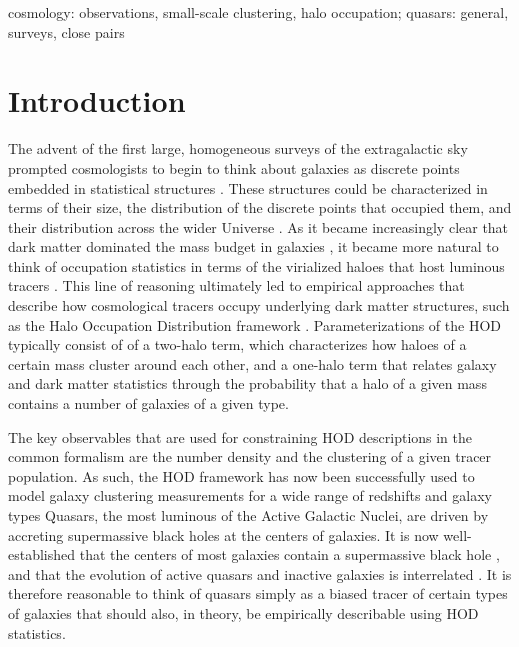 \documentclass[useAMS,usenatbib]{mn2e}
\begin{document}
 \begin{keywords}
 cosmology: observations, small-scale clustering, halo occupation; quasars: general, surveys, close pairs
 \end{keywords}

\section{Introduction}
\label{intro}
The advent of the first large, homogeneous surveys of the extragalactic sky prompted
cosmologists to begin to think about galaxies as discrete points embedded in 
statistical structures \citep[e.g.][]{nsz62,ns74}. These structures could
be characterized in terms of their size, the distribution of the discrete points
that occupied them, and their distribution across the wider Universe
 \citep[see, e.g. ][for a review]{cs02}. As it became increasingly clear
 that dark matter dominated the mass budget in galaxies \citep[e.g.][]{Roo72,Ost74,Rub78}, it became more natural
 to think of occupation statistics in terms of the virialized haloes that host 
 luminous tracers \citep[e.g.][]{Whi78}.
This line of reasoning ultimately led to empirical approaches that describe how 
cosmological tracers occupy underlying dark matter structures, such as the Halo 
Occupation Distribution framework \citep[HOD; e.g., ][and references therein]{bw02,zh07}.
Parameterizations of the HOD typically consist of of a two-halo term, which characterizes how haloes of a certain
mass cluster around each other, and a one-halo term that relates galaxy and dark matter statistics through the
probability that a halo of a given mass contains a number of galaxies of a given
type. 

The key observables that are used for constraining HOD descriptions in the common formalism
are the number density and the clustering of a given tracer population. 
As such, the HOD framework has now been successfully used to model galaxy
clustering measurements for a wide range of redshifts and galaxy
types \citep[e.g.,][]{2dFsurv,daw16}
Quasars, the most luminous of the Active Galactic Nuclei, are driven by accreting
supermassive black holes at the centers of galaxies. It is now well-established that the centers of most galaxies 
contain a supermassive black hole \citep[e.g.][]{Kor95}, and that the evolution of active quasars and inactive 
galaxies is interrelated \citep[e.g.][]{Kau00}. It is therefore reasonable to think of quasars simply as a biased tracer
of certain types of galaxies that should also, in theory, be empirically describable using HOD statistics.
\end{document}
